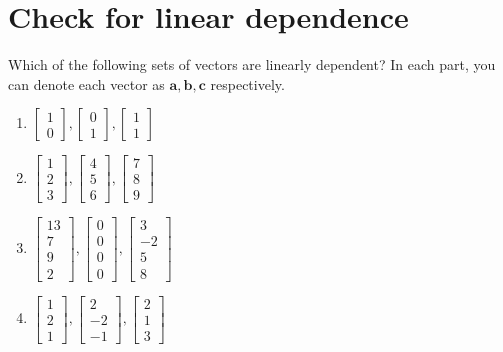 \documentclass[12pt]{article}
\begin{document}
\section{Check for linear dependence}
Which of the following sets of vectors are linearly dependent?
In each part, you can denote each vector as $\mathbf{a},\mathbf{b},\mathbf{c}$ respectively.
\begin{enumerate}
    \item $\begin{bmatrix}
    1 \\ 0\end{bmatrix}, \begin{bmatrix}
    0 \\ 1\end{bmatrix}, \begin{bmatrix}
    1 \\ 1\end{bmatrix}$
    \item $\begin{bmatrix}
    1 \\ 2\\3\end{bmatrix}, \begin{bmatrix}
    4 \\ 5\\6\end{bmatrix}, \begin{bmatrix}
    7\\ 8\\9\end{bmatrix}$
    \item $\begin{bmatrix}
    13 \\ 7 \\ 9\\ 2\end{bmatrix}, \begin{bmatrix}
    0 \\ 0 \\ 0\\0\end{bmatrix}, \begin{bmatrix}
    3\\ -2 \\ 5\\8\end{bmatrix}$
    \item $\begin{bmatrix}
    1 \\ 2 \\ 1\end{bmatrix}, \begin{bmatrix}
    2 \\ -2 \\ -1\end{bmatrix}, \begin{bmatrix}
    2 \\ 1\\3\end{bmatrix}$
\end{enumerate}
\end{document}
